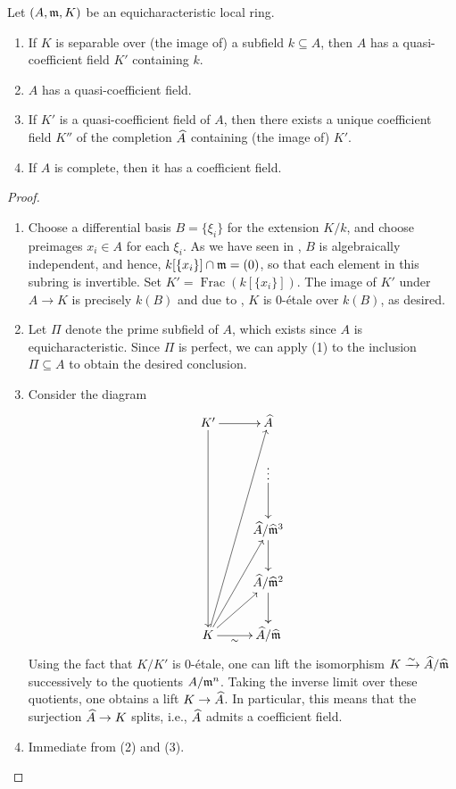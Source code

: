 \begin{theorem}
    Let $(A,\mathfrak{m}, K)$ be an equicharacteristic local ring. 
    \begin{enumerate}[label=(\arabic*)]
        \item If $K$ is separable over (the image of) a subfield $k\subseteq A$, then $A$ has a quasi-coefficient field $K'$ containing $k$.
        \item $A$ has a quasi-coefficient field. 
        \item If $K'$ is a quasi-coefficient field of $A$, then there exists a unique coefficient field $K''$ of the completion $\widehat{A}$ containing (the image of) $K'$.
        \item If $A$ is complete, then it has a coefficient field. 
    \end{enumerate}
\end{theorem}
\begin{proof}
\begin{enumerate}[label=(\arabic*)]
    \item Choose a differential basis $B = \{\xi_i\}$ for the extension $K/k$, and choose preimages $x_i\in A$ for each $\xi_i$. As we have seen in , $B$ is algebraically independent, and hence, $k[\{x_i\}]\cap\mathfrak{m} = (0)$, so that each element in this subring is invertible. Set $K' = \operatorname{Frac}\left(k[\{x_i\}]\right)$. The image of $K'$ under $A\to K$ is precisely $k(B)$ and due to , $K$ is $0$-\'etale over $k(B)$, as desired.

    \item Let $\Pi$ denote the prime subfield of $A$, which exists since $A$ is equicharacteristic. Since $\Pi$ is perfect, we can apply (1) to the inclusion $\Pi\subseteq A$ to obtain the desired conclusion.
    
    \item Consider the diagram 
    \begin{equation*}
        \xymatrix {
            K'\ar[r]\ar[dddd] & \wh{A}\\
            & \vdots\ar[d]\\
            & \wh A/\wh\frakm^3\ar[d]\\
            & \wh A/\wh\frakm^2\ar[d]\\
            K\ar[r]_-{\sim}\ar[ru]\ar[ruu]\ar[ruuuu] & \wh{A}/\wh{\frakm}
        }
    \end{equation*}
    Using the fact that $K/K'$ is $0$-\'etale, one can lift the isomorphism $K\xrightarrow{\sim}\widehat{A}/\widehat{\mathfrak{m}}$ successively to the quotients $A/\mathfrak{m}^n$. Taking the inverse limit over these quotients, one obtains a lift $K\to\widehat{A}$. In particular, this means that the surjection $\widehat{A}\to K$ splits, i.e., $\widehat{A}$ admits a coefficient field. 

    \item Immediate from (2) and (3). \qedhere
\end{enumerate}
\end{proof}

